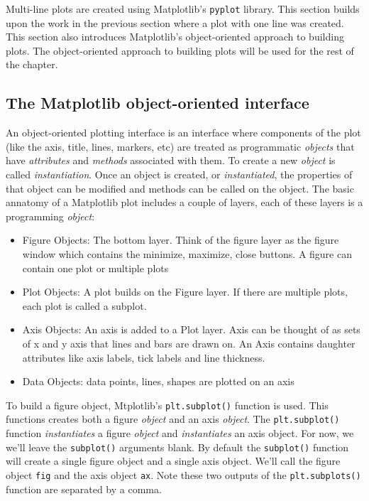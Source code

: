 \documentclass{book}
\providecommand{\tightlist}{%
      \setlength{\itemsep}{0pt}\setlength{\parskip}{0pt}}
\begin{document}
    
        Multi-line plots are created using Matplotlib's \lstinline!pyplot!
library. This section builds upon the work in the previous section where
a plot with one line was created. This section also introduces
Matplotlib's object-oriented approach to building plots. The
object-oriented approach to building plots will be used for the rest of
the chapter.
    




    
        \subsection{The Matplotlib object-oriented
interface}\label{the-matplotlib-object-oriented-interface}

An object-oriented plotting interface is an interface where components
of the plot (like the axis, title, lines, markers, etc) are treated as
programmatic \emph{objects} that have \emph{attributes} and
\emph{methods} associated with them. To create a new \emph{object} is
called \emph{instantiation}. Once an object is created, or
\emph{instantiated}, the properties of that object can be modified and
methods can be called on the object. The basic annatomy of a Matplotlib
plot includes a couple of layers, each of these layers is a programming
\emph{object}:

\begin{itemize}
\tightlist
\item
  Figure Objects: The bottom layer. Think of the figure layer as the
  figure window which contains the minimize, maximize, close buttons. A
  figure can contain one plot or multiple plots
\item
  Plot Objects: A plot builds on the Figure layer. If there are multiple
  plots, each plot is called a subplot.
\item
  Axis Objects: An axis is added to a Plot layer. Axis can be thought of
  as sets of x and y axis that lines and bars are drawn on. An Axis
  contains daughter attributes like axis labels, tick labels and line
  thickness.
\item
  Data Objects: data points, lines, shapes are plotted on an axis
\end{itemize}
    




    
        To build a figure object, Mtplotlib's \lstinline!plt.subplot()! function
is used. This functions creates both a figure \emph{object} and an axis
\emph{object}. The \lstinline!plt.subplot()! function
\emph{instantiates} a figure \emph{object} and \emph{instantiates} an
axis object. For now, we we'll leave the \lstinline!subplot()! arguments
blank. By default the \lstinline!subplot()! function will create a
single figure object and a single axis object. We'll call the figure
object \lstinline!fig! and the axis object \lstinline!ax!. Note these
two outputs of the \lstinline!plt.subplots()! function are separated by
a comma.
\end{document}
